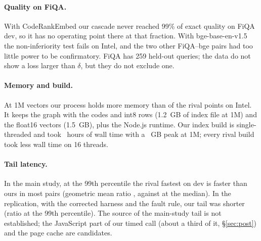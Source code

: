 \paragraph{Quality on FiQA.} With CodeRankEmbed our cascade never reached 99\% of exact quality on FiQA
dev, so it has no operating point there at that fraction. With bge-base-en-v1.5 the non-inferiority test
fails on Intel, and the two other FiQA--bge pairs had too little power to be confirmatory. FiQA has 259
held-out queries; the data do not show a loss larger than $\delta$, but they do not exclude one.

\paragraph{Memory and build.} At 1M vectors our process holds more memory than  of
the  rival points on Intel. It keeps the graph with the codes and int8 rows (1.2~GB of
index file at 1M) and the float16 vectors (1.5~GB), plus the Node.js runtime. Our index build is
single-threaded and took ~hours of wall time with a ~GB peak at 1M;
every rival build took less wall time on 16 threads.

\paragraph{Tail latency.} In the main study, at the 99th percentile the rival fastest on dev is faster than ours
in most pairs (geometric mean ratio , against  at the median). In the replication, with
the corrected harness and the fault rule, our tail was shorter (ratio  at the 99th percentile). The source
of the main-study tail is not established; the JavaScript part of our timed call (about a third of it,
\S\ref{sec:post}) and the page cache are candidates.

